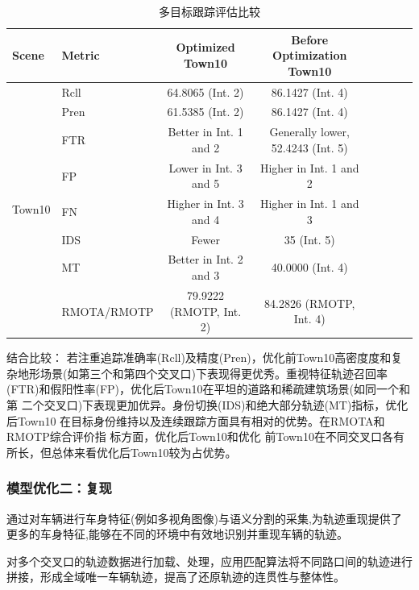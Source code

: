 \begin{table}[htbp]
	\centering
	\caption{多目标跟踪评估比较}
	\label{tab:tracking_comparison}
	\begin{tabular}{@{}llcccccc@{}}
		\toprule
		\textbf{Scene} & \textbf{Metric} & \textbf{Optimized Town10} & \textbf{Before Optimization Town10} \\
		\midrule
		\multirow{8}{*}{Town10} 
		& Rcll & 64.8065 (Int. 2) & 86.1427 (Int. 4) \\
		& Pren & 61.5385 (Int. 2) & 86.1427 (Int. 4) \\
		& FTR & Better in Int. 1 and 2 & Generally lower, 52.4243 (Int. 5) \\
		& FP & Lower in Int. 3 and 5 & Higher in Int. 1 and 2 \\
		& FN & Higher in Int. 3 and 4 & Higher in Int. 1 and 3 \\
		& IDS & Fewer & 35 (Int. 5) \\
		& MT & Better in Int. 2 and 3 & 40.0000 (Int. 4) \\
		& RMOTA/RMOTP & 79.9222 (RMOTP, Int. 2) & 84.2826 (RMOTP, Int. 4) \\
		\bottomrule
	\end{tabular}
\end{table}



结合比较：
若注重追踪准确率(Rcll)及精度(Pren)，优化前Town10高密度度和复杂地形场景(如第三个和第四个交叉口)下表现得更优秀。重视特征轨迹召回率 (FTR)和假阳性率(FP)，优化后Town10在平坦的道路和稀疏建筑场景(如同一个和第 二个交叉口)下表现更加优异。身份切换(IDS)和绝大部分轨迹(MT)指标，优化后Town10 在目标身份维持以及连续跟踪方面具有相对的优势。在RMOTA和RMOTP综合评价指 标方面，优化后Town10和优化 前Town10在不同交叉口各有所长，但总体来看优化后Town10较为占优势。














\subsubsection{模型优化二：复现}

通过对车辆进行车身特征(例如多视角图像)与语义分割的采集,为轨迹重现提供了更多的车身特征,能够在不同的环境中有效地识别并重现车辆的轨迹。

对多个交叉口的轨迹数据进行加载、处理，应用匹配算法将不同路口间的轨迹进行拼接，形成全域唯一车辆轨迹，提高了还原轨迹的连贯性与整体性。

